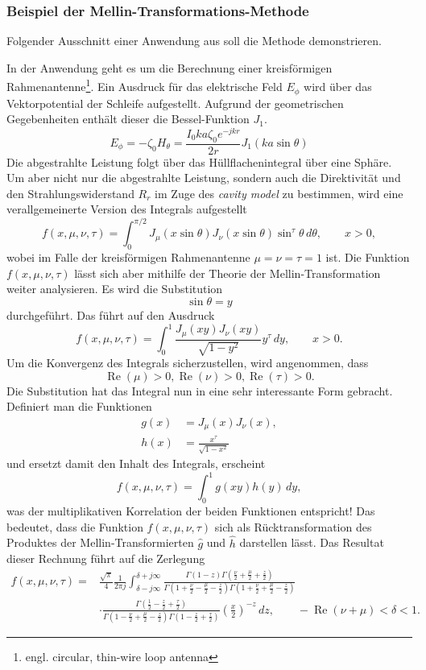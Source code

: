 \subsubsection{Beispiel der Mellin-Transformations-Methode}
Folgender Ausschnitt einer Anwendung aus\cite{mellin:mellin-transform-method} 
soll die Methode demonstrieren.

In der Anwendung geht es um die Berechnung einer 
kreisförmigen Rahmenantenne\footnote{engl. circular, thin-wire loop antenna}.
Ein Ausdruck für das elektrische Feld $E_\phi $ wird über das Vektorpotential 
der Schleife aufgestellt.
Aufgrund der geometrischen Gegebenheiten enthält dieser die Bessel-Funktion $J_1$.
\[
    E_\phi 
    = -\zeta_0 H_\theta  
    = \frac{I_0ka\zeta_0e^{-jkr}}{2r} J_1(ka \sin\theta)
\]
Die abgestrahlte Leistung folgt über das Hüllflachenintegral über eine Sphäre.
Um aber nicht nur die abgestrahlte Leistung, sondern auch die Direktivität und 
den Strahlungswiderstand $R_r$ im Zuge des {\em cavity model} zu bestimmen, 
wird eine verallgemeinerte Version des Integrals aufgestellt
\[
    f(x, \mu, \nu, \tau)
    = \int_{0}^{\pi/2} J_\mu(x \sin\theta) J_\nu(x \sin\theta) 
    \sin^\tau \theta \,d\theta, \qquad x > 0 
    ,
\]
wobei im Falle der kreisförmigen Rahmenantenne $\mu = \nu = \tau = 1$ ist.
Die Funktion $f(x, \mu, \nu, \tau)$ lässt sich aber mithilfe der Theorie 
der Mellin-Transformation weiter analysieren.
Es wird die Substitution
\[
    \sin\theta = y
\]
durchgeführt.
Das führt auf den Ausdruck
\[
    f(x, \mu, \nu, \tau)
    = \int_{0}^{1} \frac{J_\mu(xy) J_\nu(xy)}{\sqrt{1-y^2}} y^\tau \,dy, 
    \qquad x > 0 
    .
\]
Um die Konvergenz des Integrals sicherzustellen, wird angenommen, dass
\[
    \operatorname{Re}(\mu) > 0,
    \operatorname{Re}(\nu) > 0,
    \operatorname{Re}(\tau) > 0.
\]
Die Substitution hat das Integral nun in eine sehr interessante Form gebracht.
Definiert man die Funktionen 
\begin{align*}
    g(x) &= J_\mu(x)J_\nu(x), \\
    h(x) &= \frac{x^\tau}{\sqrt{1-x^2}} 
\end{align*}
und ersetzt damit den Inhalt des Integrals, erscheint
\[
    f(x, \mu, \nu, \tau)
    = \int_{0}^{1} g(xy) h(y) \,dy, 
\]
was der multiplikativen Korrelation der beiden Funktionen entspricht!
Das bedeutet, dass die Funktion $f(x, \mu, \nu, \tau)$ sich als 
Rücktransformation des Produktes der Mellin-Transformierten $\hat{g}$ 
und $\hat{h}$ darstellen lässt.
Das Resultat dieser Rechnung führt auf die Zerlegung 
\begin{align*}
    f(x, \mu, \nu, \tau)
    = &\frac{\sqrt{\pi}}{4} \frac{1}{2\pi j} 
    \int_{\delta -j\infty}^{\delta +j\infty} 
    \frac{\Gamma(1 - z)\Gamma(\frac{\nu}{2}+\frac{\mu}{2}+\frac{z}{2})}{\Gamma(1+\frac{\nu}{2}-\frac{\mu}{2}-\frac{z}{2}) \Gamma(1+\frac{\nu}{2}+\frac{\mu}{2}-\frac{z}{2})} \\
    &\cdot \frac{\Gamma(\frac{1}{2}-\frac{z}{2}+\frac{\tau}{2})}{\Gamma(1-\frac{\nu}{2}+\frac{\mu}{2}-\frac{z}{2})\Gamma(1-\frac{z}{2}+\frac{\tau}{2})} 
    \left(\frac{x}{2}\right)^{-z} \,dz,
    \qquad -\operatorname{Re}(\nu + \mu) < \delta < 1
    .
\end{align*}
